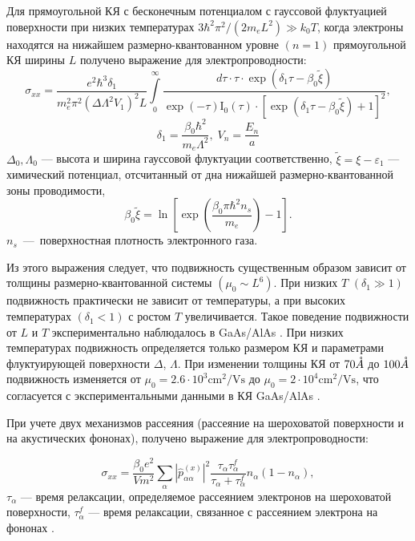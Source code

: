 Для прямоугольной КЯ с бесконечным потенциалом с гауссовой флуктуацией поверхности при низких температурах  $3\hbar^2 \pi^2 /\left(2m_e L^2 \right) \gg k_0 T$, когда электроны находятся на нижайшем размерно-квантованном уровне $(n=1)$ прямоугольной КЯ ширины $L$ получено выражение для электропроводности:
\begin{equation} \label{eq:syn_15}
\sigma _{xx} =\frac{e^2 \hbar^3 \delta_1}{m_e^2 \pi^2 \left(\Delta \Lambda^2 V_1 \right)^2 L} \int\limits_0^\infty { \frac{d\tau \cdot \tau \cdot \exp \left(\delta_1 \tau -\beta_0 \tilde{\xi }\right)}{\exp(-\tau )\mathrm{I}_0 (\tau )\cdot \left[\exp \left(\delta_1 \tau -\beta_0 \tilde{\xi }\right)+1\right]^2 }},
\end{equation}
\[
\delta_1 =\frac{\beta_0 \hbar^2 }{m_e \Lambda^2 }, \; V_n=\frac{E_n}{a}
\] 
$\Delta_0, \Lambda_0$ --- высота и ширина гауссовой флуктуации соответственно, $\tilde{\xi }=\xi -\varepsilon _{1} $ --- химический потенциал, отсчитанный от дна нижайшей размерно-квантованной зоны проводимости,
\begin{equation} \label{eq:syn_16}
\beta_0 \tilde{\xi }=\ln\left[\exp\left(\frac{\beta_0 \pi \hbar^2 n_s }{m_e} \right)-1\right].
\end{equation}
$n_s $~---~поверхностная плотность электронного газа.

Из этого выражения следует, что подвижность существенным образом зависит от толщины размерно-квантованной системы $(\mu_0 \sim L^6 )$. При низких $T$ $(\delta_1 \gg 1)$ подвижность практически не зависит от температуры, а при высоких температурах $(\delta_1 <1)$ с ростом $T$ увеличивается. Такое поведение подвижности от $L$ и $T$ экспериментально наблюдалось в GaAs/AlAs \cite{Sakaki1987}. При низких температурах подвижность определяется только размером КЯ и параметрами флуктуирующей поверхности $\Delta $, $\Lambda $. При изменении толщины КЯ от $70 \AA$ до $100 \AA$ подвижность изменяется от $\mu_0 =2.6\cdot 10^3 \text{cm}^2 / \text{Vs}$ до $\mu_0 =2\cdot 10^4 \text{cm}^2 /\text{Vs}$, что согласуется с экспериментальными данными в КЯ GaAs/AlAs \cite{Sakaki1987}.

При учете двух механизмов рассеяния (рассеяние на шероховатой поверхности и на акустических фононах), получено выражение для электропроводности:

\begin{equation} \label{eq:syn_17}
\sigma _{xx} =\frac{\beta_0 e^2 }{Vm^2 } \sum _{\alpha }\left|\hat{p}_{\alpha \alpha }^{(x)} \right|^2 \frac{\tau _{\alpha } \tau_{\alpha }^f }{\tau_{\alpha } +\tau_{\alpha }^f } n_{\alpha } \left(1-n_{\alpha } \right),
\end{equation}
$\tau _{\alpha } $ --- время релаксации, определяемое рассеянием электронов на шероховатой поверхности, $\tau_{\alpha }^f $ --- время релаксации, связанное с рассеянием электрона на фононах \cite{Khamidullin2002}.

